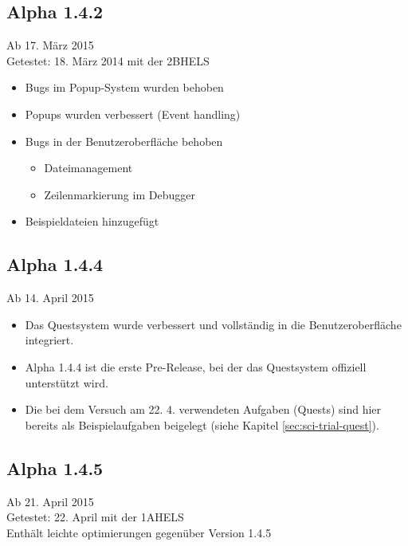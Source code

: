 \subsection*{Alpha 1.4.2}
Ab 17. März 2015\\
Getestet: 18. März 2014 mit der 2BHELS
\begin{itemize}
\item Bugs im Popup-System wurden behoben
\item Popups wurden verbessert (Event handling)
\item Bugs in der Benutzeroberfläche behoben
\begin{itemize}
\item Dateimanagement
\item Zeilenmarkierung im Debugger
\end{itemize}
\item Beispieldateien hinzugefügt
\end{itemize}

\subsection*{Alpha 1.4.4}
Ab 14. April 2015
\begin{itemize}
\item Das Questsystem wurde verbessert und vollständig in die Benutzeroberfläche integriert.
\item Alpha 1.4.4 ist die erste Pre-Release, bei der das Questsystem offiziell unterstützt wird.
\item Die bei dem Versuch am 22. 4. verwendeten Aufgaben (Quests) sind hier bereits als Beispielaufgaben beigelegt (siehe Kapitel \ref{sec:sci-trial-quest}).
\end{itemize}

\subsection*{Alpha 1.4.5}
Ab 21. April 2015\\
Getestet: 22. April mit der 1AHELS\\
Enthält leichte optimierungen gegenüber Version 1.4.5 


